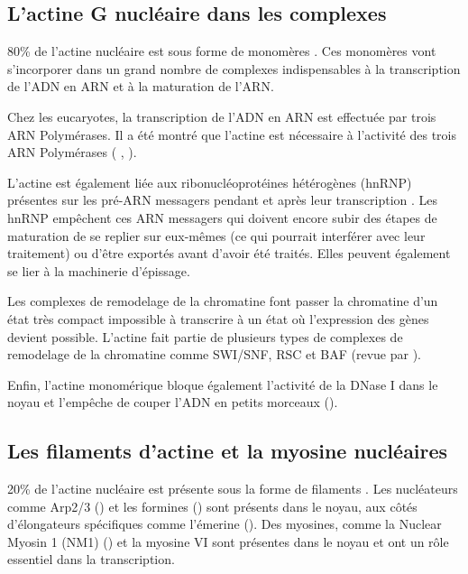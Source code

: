 \subsection{L'actine G nucléaire dans les complexes}

80\% de l'actine nucléaire est sous forme de monomères \parencite{mcdonald_nucleoplasmic_2006}. Ces monomères vont s'incorporer dans un grand nombre de complexes indispensables à la transcription de l'ADN en ARN et à la maturation de l'ARN. 

Chez les eucaryotes, la transcription de l'ADN en ARN est effectuée par trois ARN Polymérases. Il a été montré que l'actine est nécessaire à l'activité des trois ARN Polymérases ( \cite{ye_nuclear_2008}, \cite{hofmann_actin_2004} \cite{hu_role_2004}).

L'actine est également liée aux ribonucléoprotéines hétérogènes (hnRNP) présentes sur les pré-ARN messagers pendant et après leur transcription \parencite{kukalev_actin_2005}. Les hnRNP empêchent ces ARN messagers qui doivent encore subir des étapes de maturation de se replier sur eux-mêmes (ce qui pourrait interférer avec leur traitement) ou d'être exportés avant d'avoir été traités. Elles peuvent également se lier à la machinerie d'épissage. 

Les complexes de remodelage de la chromatine font passer la chromatine d'un état très compact impossible à transcrire à un état où l'expression des gènes devient possible. L'actine fait partie de plusieurs types de complexes de remodelage de la chromatine comme SWI/SNF, RSC et BAF (revue par \cite{farrants_chromatin_2008}). 

Enfin, l'actine monomérique bloque également l'activité de la DNase I dans le noyau et l'empêche de couper l'ADN en petits morceaux (\cite{lazarides_actin_1974}). 

\subsection{Les filaments d'actine et la myosine nucléaires}

20\% de l'actine nucléaire est présente sous la forme de filaments \parencite{mcdonald_nucleoplasmic_2006}. Les nucléateurs comme Arp2/3 (\cite{yoo_novel_2006}) et les formines (\cite{baarlink_nuclear_2013}) sont présents dans le noyau, aux côtés d'élongateurs spécifiques comme l'émerine (\cite{ho_lamin_2013}). 
Des myosines, comme la Nuclear Myosin 1 (NM1) (\cite{nowak_evidence_1997})  et la myosine VI sont présentes dans le noyau et ont un rôle essentiel dans la transcription. 

